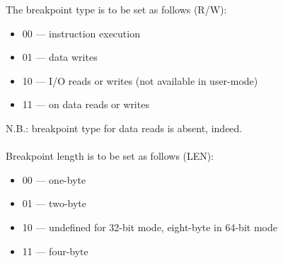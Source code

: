 The breakpoint type is to be set as follows (R/W):

\begin{itemize}
\item 00 --- instruction execution
\item 01 --- data writes
\item 10 --- I/O reads or writes (not available in user-mode)
\item 11 --- on data reads or writes
\end{itemize}

N.B.: breakpoint type for data reads is absent, indeed. \\
\\
Breakpoint length is to be set as follows (LEN):

\begin{itemize}
\item 00 --- one-byte
\item 01 --- two-byte
\item 10 --- undefined for 32-bit mode, eight-byte in 64-bit mode
\item 11 --- four-byte
\end{itemize}
